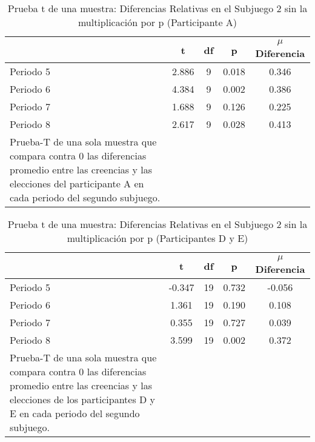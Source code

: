 \begin{table}[h]
\caption[Prueba t de una muestra: Diferencias Relativas en el Subjuego 2 sin la multioplicación por p (Participante A)]{Prueba t de una muestra: Diferencias Relativas en el Subjuego 2 sin la multiplicación por p (Participante A)}
\label{DN-S1}
\centering
\begin{tabular}{l | c c c | c}
\toprule
\textbf{} & \textbf{t} & \textbf{df} & \textbf{p} & \textbf{$\mu$Diferencia}\\
\midrule
Periodo 5 & 2.886 & 9 & 0.018 & 0.346\\
Periodo 6 & 4.384 & 9 & 0.002 & 0.386\\
Periodo 7 & 1.688 & 9 & 0.126 & 0.225\\
Periodo 8 & 2.617 & 9 & 0.028 & 0.413\\
\bottomrule
Prueba-T de una sola muestra que compara contra 0 las diferencias promedio entre las creencias y las elecciones del participante A en cada periodo del segundo subjuego.
\end{tabular}
\end{table}











\begin{table}[h]
\caption[Prueba t de una muestra: Diferencias Relativas en el Subjuego 2 sin la multiplicación por p (Participantes D y E)]{Prueba t de una muestra: Diferencias Relativas en el Subjuego 2 sin la multiplicación por p (Participantes D y E)}
\label{DN-S1}
\centering
\begin{tabular}{l | c c c | c}
\toprule
\textbf{} & \textbf{t} & \textbf{df} & \textbf{p} & \textbf{$\mu$Diferencia}\\
\midrule
Periodo 5 & -0.347 & 19 & 0.732 & -0.056\\
Periodo 6 & 1.361 & 19 & 0.190 & 0.108\\
Periodo 7 & 0.355 & 19 & 0.727 & 0.039\\
Periodo 8 & 3.599 & 19 & 0.002 & 0.372\\
\bottomrule
Prueba-T de una sola muestra que compara contra 0 las diferencias promedio entre las creencias y las elecciones de los participantes D y E en cada periodo del segundo subjuego.
\end{tabular}
\end{table}